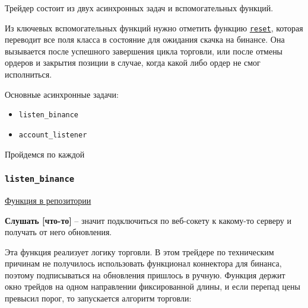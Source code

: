 Трейдер состоит из двух асинхронных задач и вспомогательных функций. 

Из ключевых вспомогательных функций нужно отметить функцию \href{https://github.com/dexety/dex-trading-system/blob/main/research/ib-0002-cross-analysis/trader.py#L303}{\texttt{reset}}, которая переводит все поля класса в состояние для ожидания скачка на бинансе. Она вызывается после успешного завершения цикла торговли, или после отмены ордеров и закрытия позиции в случае, когда какой либо ордер не смог исполниться.

Основные асинхронные задачи:
\begin{itemize}
    \item \texttt{listen\_binance}
    \item \texttt{account\_listener}
\end{itemize}

Пройдемся по каждой

\subsubsection{\texttt{listen\_binance}}

\href{https://github.com/dexety/dex-trading-system/blob/main/research/ib-0002-cross-analysis/trader.py#L167}{Функция в репозитории}

\begin{definition}
\textbf{Слушать [что-то]} -- значит подключиться по веб-сокету к какому-то серверу и получать от него обновления.
\end{definition} 

Эта функция реализует логику торговли. В этом трейдере по техническим причинам не получилось использовать функционал коннектора для бинанса, поэтому подписываться на обновления пришлось в ручную. Функция держит окно трейдов на одном направлении фиксированной длины, и если перепад цены превысил порог, то запускается алгоритм торговли:

